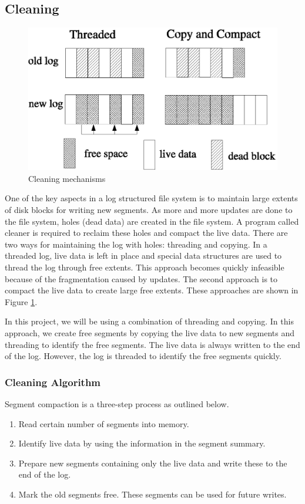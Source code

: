 \documentclass{article}
\begin{document}
\subsection{Cleaning}
\begin{figure}
\centering
\includegraphics[scale=0.7]{lfs3}
\caption{Cleaning mechanisms}
\label{cleaning}
\end{figure}


One of the key aspects in a log structured file system is to maintain large extents of
disk blocks for writing new segments. As more and more updates are done to the
file system, holes (dead data) are created in the file system. A program
called cleaner is required to reclaim these holes and compact the live data.
There are two ways for maintaining the log with holes: threading and copying.
In a threaded log, live data is left in place and special data
structures are used to thread the log through free extents. This approach
becomes quickly infeasible because of the fragmentation caused by updates. The
second approach is to compact the live data to create large free extents.
These approaches are shown in Figure \ref{cleaning}.

In this project, we will be using a combination of threading and copying. In
this approach, we create free segments by copying the live data to new segments
and threading to identify the free segments. The live data is always
written to the end of the log. However, the log is threaded to identify the
free segments quickly.

\subsubsection{Cleaning Algorithm}
Segment compaction is a three-step process as outlined below.
\begin{enumerate}
\item
Read certain number of segments into memory.
\item
Identify live data by using the information in the segment summary.
\item
Prepare new segments containing only the live data and write these to the end
of the log.
\item
Mark the old segments free. These segments can be used for future writes.
\end{enumerate}
\end{document}
